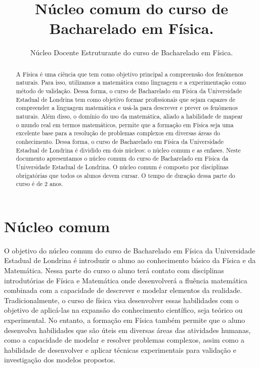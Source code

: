 \documentclass[a4paper, 12pt]{article}
\title{Núcleo comum do curso de Bacharelado em Física.}
\author{Núcleo Docente Estruturante do curso de Bacharelado em Física.}
\newcounter{fis}
\newcounter{mat}
\begin{document}
\maketitle

\begin{abstract}
    A Física é uma ciência que tem como objetivo principal a compreensão dos fenômenos
    naturais. Para isso, utilizamos a matemática como linguagem e a experimentação como
    método de validação. Dessa forma, o curso de Bacharelado em Física da Universidade
    Estadual de Londrina tem como objetivo formar profissionais que sejam capazes de
    compreender a linguagem matemática e usá-la para descrever e prever os fenômenos
    naturais. Além disso, o domínio do uso da matemática, aliado a habilidade de mapear
    o mundo real em termos matemáticos, permite que a formação em Física seja uma
    excelente base para a resolução de problemas complexos em diversas áreas do
    conhecimento. Dessa forma, o curso de Bacharelado em Física da Universidade
    Estadual de Londrina é dividido em dois núcleos: o núcleo comum e as enfases. Neste
    documento apresentamos o núcleo comum do curso de Bacharelado em Física da
    Universidade Estadual de Londrina. O núcleo comum é composto por disciplinas
    obrigatórias que todos os alunos devem cursar. O tempo de duração dessa parte do
    curso é de 2 anos.
\end{abstract}

\section*{Núcleo comum}

O objetivo do núcleo comum do curso de Bacharelado em Física da Universidade Estadual
de Londrina é introduzir o aluno ao conhecimento básico da Física e da Matemática.
Nessa parte do curso o aluno terá contato com disciplinas introdutórias de Física e
Matemática onde desenvolverá a fluência matemática combinada com a capacidade de
descrever e modelar elementos da realidade. Tradicionalmente, o curso de física visa
desenvolver essas habilidades com o objetivo de aplicá-las na expansão do conhecimento
científico, seja teórico ou experimental. No entanto, a formação em Física também
permite que o aluno desenvolva habilidades que são úteis em diversas áreas das
atividades humanas, como a capacidade de modelar e resolver problemas complexos, assim
como a habilidade de desenvolver e aplicar técnicas experimentais para validação e
investigação dos modelos propostos.
\end{document}

